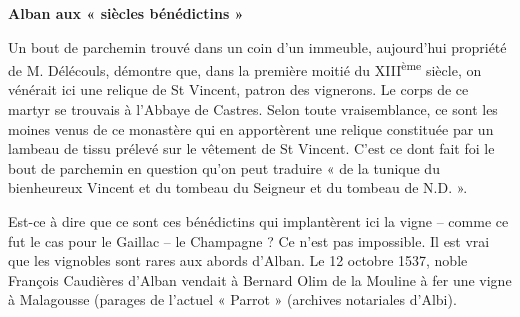 
\thispagestyle{plain}

\vspace*{12mm}

\begin{center}
    {\Large\bfseries Alban aux « siècles bénédictins »}
\end{center}

\vspace{18mm}

\noindent
Un bout de parchemin trouvé dans un coin d'un immeuble, aujourd'hui
propriété de M. Délécouls, démontre que, dans la première moitié du
XIII\textsuperscript{ème} siècle, on vénérait ici une relique de
St Vincent, patron des vignerons. Le corps de ce martyr se trouvais
à l'Abbaye de Castres. Selon toute vraisemblance, ce sont les moines
venus de ce monastère qui en apportèrent une relique constituée par
un lambeau de tissu prélevé sur le vêtement de St Vincent. C'est ce
dont fait foi le bout de parchemin en question qu'on peut traduire
« de la tunique du bienheureux Vincent et du tombeau du Seigneur et
du tombeau de N.D. ».

\par\vspace{12mm}

\noindent
Est-ce à dire que ce sont ces bénédictins qui implantèrent ici la
vigne -- comme ce fut le cas pour le Gaillac -- le Champagne ?
Ce n'est pas impossible. Il est vrai que les vignobles sont rares
aux abords d'Alban. Le 12 octobre 1537, noble François Caudières
d'Alban vendait à Bernard Olim de la Mouline à fer une vigne à
Malagousse (parages de l'actuel « Parrot » (archives notariales
d'Albi).

\vfill
